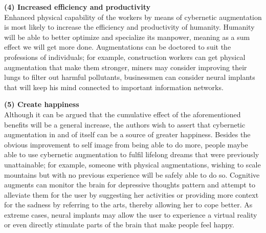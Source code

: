 {\bf (4) Increased efficiency and productivity} \\
Enhanced physical capability of the workers by means of cybernetic augmentation is most likely to increase the efficiency and productivity of humanity. Humanity will be able to better optimize and specialize its manpower, meaning as a sum effect we will get more done. Augmentations can be doctored to suit the professions of individuals; for example, construction workers can get physical augmentation that make them stronger, miners may consider improving their lungs to filter out harmful pollutants, businessmen can consider neural implants that will keep his mind connected to important information networks.

{\bf (5) Create happiness} \\
Although it can be argued that the cumulative effect of the aforementioned benefits will be a general increase, the authors wish to assert that cybernetic augmentation in and of itself can be a source of greater happiness. Besides the obvious improvement to self image from being able to do more, people maybe able to use cybernetic augmentation to fulfil lifelong dreams that were previously unattainable; for example, someone with physical augmentations, wishing to scale mountains but with no previous experience will be safely able to do so. Cognitive augments can monitor the brain for depressive thoughts pattern and attempt to alleviate them for the user by suggesting her activities or providing more context for the sadness by referring to the arts, thereby allowing her to cope better. As extreme cases, neural implants may allow the user to experience a virtual reality or even directly stimulate parts of the brain that make people feel happy.



